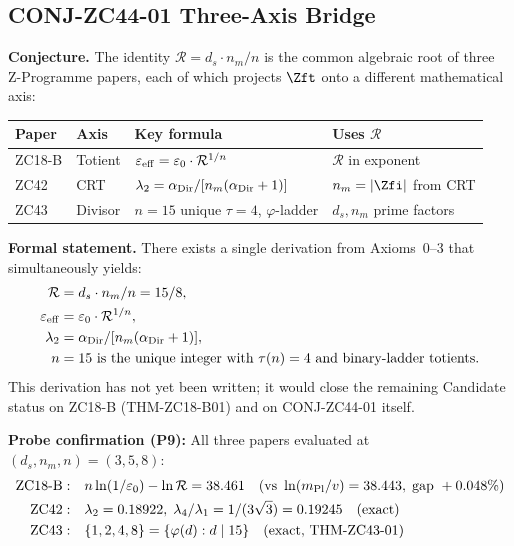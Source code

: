 \documentclass[12pt, a4paper]{article}
\providecommand{\eps}{\varepsilon_0}
\providecommand{\ltwo}{\lambda_2}
\providecommand{\nm}{n_m}
\providecommand{\ds}{d_s}
\providecommand{\phitot}{\varphi}
\providecommand{\alphDir}{\alpha_{\rm Dir}}
\providecommand{\Rcal}{\mathcal{R}}
\providecommand{\epseff}{\varepsilon_{\rm eff}}
\begin{document}
\subsection{CONJ-ZC44-01 \quad Three-Axis Bridge}


\begin{formalbox}[title={CONJ-ZC44-01: Three-Axis Bridge ---
  ZC18-B, ZC42, ZC43 as Projections of $\mathbb{Z}_{15}$
  (Candidate)}]

\textbf{Conjecture.}
The identity $\Rcal = \ds\cdot\nm/n$ is the common
algebraic root of three Z-Programme papers, each of which
projects $\Zft$ onto a different mathematical axis:

\medskip
\begin{center}
{\small
\renewcommand{\arraystretch}{1.35}
\begin{tabular}{p{1.7cm}p{2.2cm}p{4.4cm}p{3.4cm}}
\toprule
\textbf{Paper} & \textbf{Axis} & \textbf{Key formula} & \textbf{Uses $\Rcal$} \\
\midrule
ZC18-B & Totient &
  $\epseff = \eps\cdot\Rcal^{1/n}$ &
  $\Rcal$ in exponent \\
ZC42 & CRT &
  $\ltwo = \alphDir/[\nm(\alphDir+1)]$ &
  $\nm = |\Zfi|$ from CRT \\
ZC43 & Divisor &
  $n=15$ unique $\tau=4$, $\phitot$-ladder &
  $\ds,\nm$ prime factors \\
\bottomrule
\end{tabular}
}
\end{center}

\medskip
\textbf{Formal statement.}
There exists a single derivation from Axioms~0--3 that
simultaneously yields:
\begin{align}
  \Rcal &= \ds\cdot\nm/n = 15/8,\notag\\
  \epseff &= \eps\cdot\Rcal^{1/n},\notag\\
  \ltwo &= \alphDir/[\nm(\alphDir+1)],\notag\\
  n &= 15\text{ is the unique integer with }
  \tau(n)=4\text{ and binary-ladder totients.}\notag
\end{align}
This derivation has not yet been written; it would close
the remaining Candidate status on ZC18-B (THM-ZC18-B01)
and on CONJ-ZC44-01 itself.

\textbf{Probe confirmation (P9):}
All three papers evaluated at $(d_s, n_m, n) = (3, 5, 8)$:
\begin{align*}
  \text{ZC18-B}: &\quad
    n\ln(1/\eps) - \ln\Rcal = 38.461
    \quad \text{(vs }\ln(m_{\rm Pl}/v) = 38.443,\;
    \text{gap }+0.048\%)\\
  \text{ZC42}: &\quad
    \ltwo = 0.18922,\;
    \lambda_4/\lambda_1 = 1/(3\sqrt{3}) = 0.19245
    \quad \text{(exact)}\\
  \text{ZC43}: &\quad
    \{1,2,4,8\} = \{\phitot(d): d\mid 15\}
    \quad \text{(exact, THM-ZC43-01)}
\end{align*}


\end{formalbox}
\end{document}

